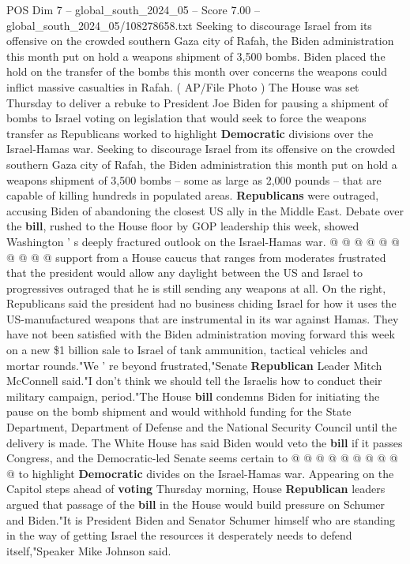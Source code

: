 \begin{textsample}{POS Dim 7 – global\_south\_2024\_05 – Score 7.00 – global\_south\_2024\_05/108278658.txt}  \label{ex:f7_pos_209}
Seeking to discourage Israel from its offensive on the crowded southern Gaza city of Rafah, the Biden administration this month put on hold a weapons shipment of 3,500 bombs.
Biden placed the hold on the transfer of the bombs this month over concerns the weapons could inflict massive casualties in Rafah. ( AP/File Photo ) The House was set Thursday to deliver a rebuke to President Joe Biden for pausing a shipment of bombs to Israel voting on legislation that would seek to force the weapons transfer as Republicans worked to highlight \textbf{Democratic} divisions over the Israel-Hamas war.
Seeking to discourage Israel from its offensive on the crowded southern Gaza city of Rafah, the Biden administration this month put on hold a weapons shipment of 3,500 bombs -- some as large as 2,000 pounds -- that are capable of killing hundreds in populated areas. \textbf{Republicans} were outraged, accusing Biden of abandoning the closest US ally in the Middle East.
Debate over the \textbf{bill}, rushed to the House floor by GOP leadership this week, showed Washington ' s deeply fractured outlook on the Israel-Hamas war. @ @ @ @ @ @ @ @ @ @ support from a House caucus that ranges from moderates frustrated that the president would allow any daylight between the US and Israel to progressives outraged that he is still sending any weapons at all.
On the right, Republicans said the president had no business chiding Israel for how it uses the US-manufactured weapons that are instrumental in its war against Hamas.
They have not been satisfied with the Biden administration moving forward this week on a new \$1 billion sale to Israel of tank ammunition, tactical vehicles and mortar rounds."We ' re beyond frustrated,"Senate \textbf{Republican} Leader Mitch McConnell said."I don't think we should tell the Israelis how to conduct their military campaign, period."The House \textbf{bill} condemns Biden for initiating the pause on the bomb shipment and would withhold funding for the State Department, Department of Defense and the National Security Council until the delivery is made.
The White House has said Biden would veto the \textbf{bill} if it passes Congress, and the Democratic-led Senate seems certain to @ @ @ @ @ @ @ @ @ @ to highlight \textbf{Democratic} divides on the Israel-Hamas war.
Appearing on the Capitol steps ahead of \textbf{voting} Thursday morning, House \textbf{Republican} leaders argued that passage of the \textbf{bill} in the House would build pressure on Schumer and Biden."It is President Biden and Senator Schumer himself who are standing in the way of getting Israel the resources it desperately needs to defend itself,"Speaker Mike Johnson said.

\end{textsample}
